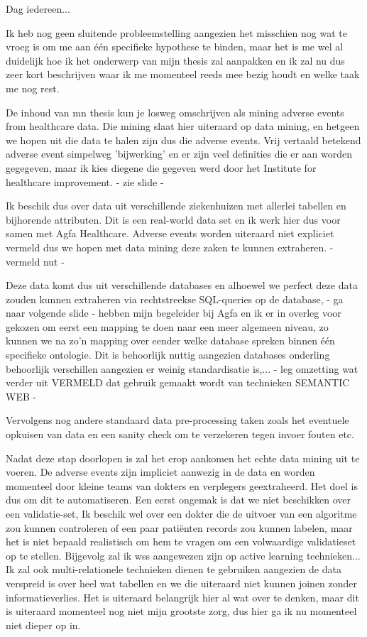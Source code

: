 Dag iedereen...


Ik heb nog geen sluitende probleemstelling aangezien het misschien nog wat te vroeg is om me aan één specifieke hypothese te binden, maar het is me wel al duidelijk hoe ik het onderwerp van mijn thesis zal aanpakken en ik zal nu dus zeer kort beschrijven waar ik me momenteel reeds mee bezig houdt en welke taak me nog rest.

De inhoud van mn thesis kun je losweg omschrijven als mining adverse events from healthcare data. Die mining slaat hier uiteraard op data mining, en hetgeen we hopen uit die data te halen zijn dus die adverse events. Vrij vertaald betekend adverse event simpelweg 'bijwerking' en er zijn veel definities die er aan worden gegegeven, maar ik kies diegene die gegeven werd door het Institute for healthcare improvement. { - zie slide - } 

Ik beschik dus over data uit verschillende ziekenhuizen met allerlei tabellen en bijhorende attributen. Dit is een real-world data set en ik werk hier dus voor samen met Agfa Healthcare. Adverse events worden uiteraard niet expliciet vermeld dus we hopen met data mining deze zaken te kunnen extraheren. { - vermeld nut -} 

Deze data komt dus uit verschillende databases en alhoewel we perfect deze data zouden kunnen extraheren via rechtstreekse SQL-queries op de database, { - ga naar volgende slide -}  hebben mijn begeleider bij Agfa en ik er in overleg voor gekozen om eerst een mapping te doen naar een meer algemeen niveau, zo kunnen we na zo'n mapping over eender welke database spreken binnen één specifieke ontologie. Dit is behoorlijk nuttig aangezien databases onderling behoorlijk verschillen aangezien er weinig standardisatie is,... { - leg omzetting wat verder uit VERMELD dat gebruik gemaakt wordt van technieken SEMANTIC WEB -} 

Vervolgens nog andere standaard data pre-processing taken zoals het eventuele opkuisen van data en een sanity check om te verzekeren tegen invoer fouten etc.

Nadat deze stap doorlopen is zal het erop aankomen het echte data mining uit te voeren. De adverse events zijn impliciet aanwezig in de data en worden momenteel door kleine teams van dokters en verplegers geextraheerd. Het doel is dus om dit te automatiseren. Een eerst ongemak is dat we niet beschikken over een validatie-set, Ik beschik wel over een dokter die de uitvoer van een algoritme zou kunnen controleren of een paar patiënten records zou kunnen labelen, maar het is niet bepaald realistisch om hem te vragen om een volwaardige validatieset op te stellen. Bijgevolg zal ik wss aangewezen zijn op active learning technieken... Ik zal ook multi-relationele technieken dienen te gebruiken aangezien de data verspreid is over heel wat tabellen en we die uiteraard niet kunnen joinen zonder informatieverlies. Het is uiteraard belangrijk hier al wat over te denken, maar dit is uiteraard momenteel nog niet mijn grootste zorg, dus hier ga ik nu momenteel niet dieper op in.

